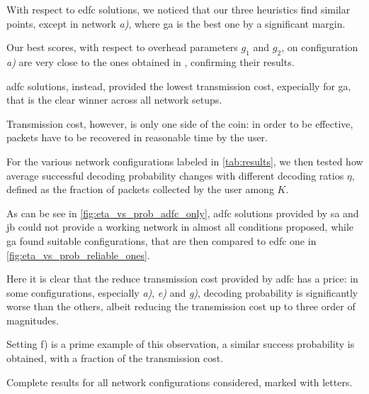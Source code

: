\documentclass[12pt,journal,draftclsnofoot,onecolumn]{IEEEtran}
\makeatletter
\let\origsubsubsection\subsubsection
\renewcommand\subsubsection{\@ifstar{\starsubsubsection}{\nostarsubsubsection}}
\newcommand\nostarsubsubsection[1]
{\subsubsectionprelude\origsubsubsection{#1}}
\newcommand\subsubsectionprelude{%
  \vspace{6pt}
}
\makeatother
\begin{document}
\smallbreak
With respect to \gls{edfc} solutions, we noticed that our three heuristics find similar points, except in network \emph{a)}, where \gls{ga} is the best one by a significant margin.

Our best scores, with respect to overhead parameters $g_1$ and $g_2$, on configuration \emph{a)} are very close to the ones obtained in \cite{Lin2007}, confirming their results.

\smallbreak
\gls{adfc} solutions, instead, provided the lowest transmission cost, expecially for \gls{ga}, that is the clear winner across all network setups.

\subsubsection{Successful decoding probability}
Transmission cost, however, is only one side of the coin: in order to be effective, packets have to be recovered in reasonable time by the user.

For the various network configurations labeled in \autoref{tab:results}, we then tested how average successful decoding probability changes with different decoding ratios $\eta$, defined as the fraction of packets collected by the user among $K$.

As can be see in \autoref{fig:eta_vs_prob_adfc_only}, \gls{adfc} solutions provided by \gls{sa} and \gls{jb} could not provide a working network in almost all conditions proposed, while \gls{ga} found suitable configurations, that are then compared to \gls{edfc} one in \autoref{fig:eta_vs_prob_reliable_ones}.

Here it is clear that the reduce transmission cost provided by \gls{adfc} has a price: in some configurations, especially \emph{a)}, \emph{e)} and \emph{g)},  decoding probability is significantly worse than the others, albeit reducing the transmission cost up to three order of magnitudes.

Setting f) is a prime example of this observation, a similar success probability is obtained, with a fraction of the transmission cost.

\clearpage
\begin{table}[htp]
	\centering
	
	\caption{Complete results for all network configurations considered, marked with letters.}
	\label{tab:results}
\end{table}
\end{document}
